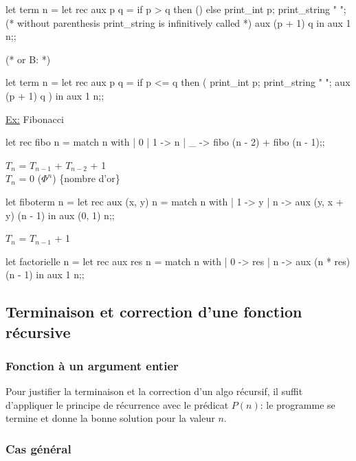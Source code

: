 \documentclass{article}
\begin{document}
	\begin{case}
let term n =
	let rec aux p q =
		if p > q then ()
		else
	print_int p; print_string " "; (* without parenthesis print_string is infinitively called *)
	aux (p + 1) q
	in aux 1 n;;
	
	(* or B: *)
	
let term n =
	let rec aux p q =
		if p <= q then
		(
			print_int p;
			print_string " ";
			aux (p + 1) q
		)
	in aux 1 n;;

	
	\end{case}

	\underline{Ex:} Fibonacci
	
	\begin{case}
let rec fibo n = match n with
| 0 | 1 -> n
| _ -> fibo (n - 2) + fibo (n - 1);;
	\end{case}
	
	$T_n$ = $T_{n-1}$ + $T_{n-2}$ + 1\\
	$T_n$ = 0 ($\Phi^n$) \{nombre d'or\} 
	
	\begin{case}
let fiboterm n =
	let rec aux (x, y) n = match n with
	| 1 -> y
	| n -> aux (y, x + y) (n - 1)
in aux (0, 1) n;;
	\end{case}
	
	$T_n$ = $T_{n - 1}$ + 1
	
	\begin{case}
let factorielle n =
	let rec aux res n = match n with
		| 0 -> res
		| n -> aux (n * res) (n - 1)
in aux 1 n;;
	\end{case}
	
	\subsection{Terminaison et correction d'une fonction récursive}
	
		\subsubsection{Fonction à un argument entier}
		
			Pour justifier la terminaison et la correction d'un algo récursif, il suffit d'appliquer le principe de récurrence avec le prédicat $P(n)$: le programme se termine et donne la bonne solution pour la valeur $n$.
			
			\subsubsection{Cas général}
			
\end{document}
